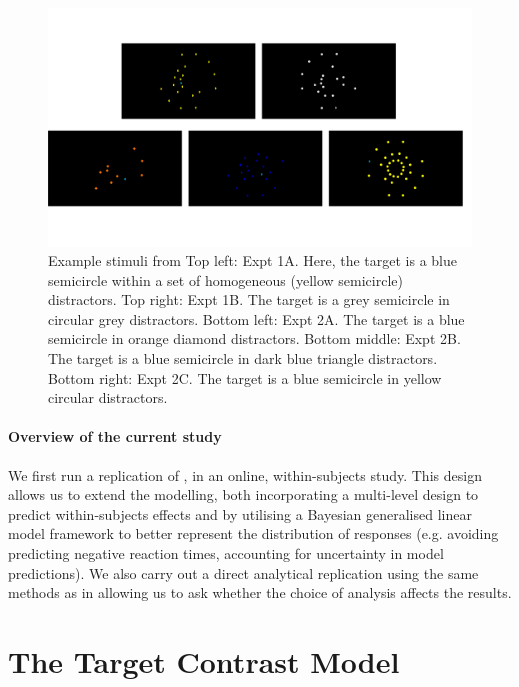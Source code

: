 \documentclass[smallextended, natbib]{svjour3}       %
\begin{document}
\begin{figure}
\centering
\includegraphics[width=\textwidth]{../plots/example_stimuli_figure.pdf}
\caption{Example stimuli from \cite{buetti2019predicting} Top left: Expt 1A. Here, the target is a blue semicircle within a set of homogeneous (yellow semicircle) distractors. Top right: Expt 1B. The target is a grey semicircle in circular grey distractors. Bottom left: Expt 2A. The target is a blue semicircle in orange diamond distractors. Bottom middle: Expt 2B. The target is a blue semicircle in dark blue triangle distractors. Bottom right: Expt 2C. The target is a blue semicircle in yellow circular distractors.}
\label{fig:buetti2019_stimulus}
\end{figure}

\paragraph{Overview of the current study}
We first run a replication of \cite{buetti2019predicting}, in an online, within-subjects study. This design allows us to extend the modelling, both incorporating a multi-level design to predict within-subjects effects and by utilising a Bayesian generalised linear model framework to better represent the distribution of responses (e.g. avoiding predicting negative reaction times, accounting for uncertainty in model predictions). We  also carry out a direct analytical replication using the same methods as in \cite{buetti2019predicting} allowing us to ask whether the choice of analysis affects the results.

\section{The Target Contrast Model}
\label{sec:reansalysis}
\end{document}
